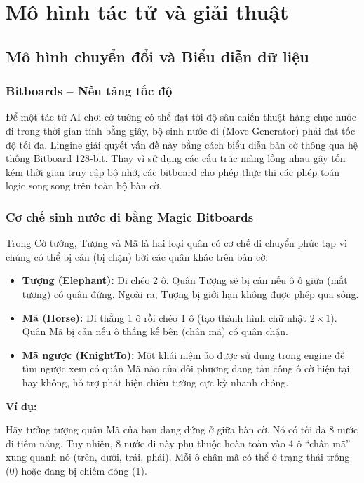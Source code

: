 \chapter{Mô hình tác tử và giải thuật}

\section{Mô hình chuyển đổi và Biểu diễn dữ liệu}

\subsection{Bitboards -- Nền tảng tốc độ}

Để một tác tử AI chơi cờ tướng có thể đạt tới độ sâu chiến thuật hàng chục nước đi trong thời gian tính bằng giây, bộ sinh nước đi (Move Generator) phải đạt tốc độ tối đa. Lingine giải quyết vấn đề này bằng cách biểu diễn bàn cờ thông qua hệ thống Bitboard 128-bit. Thay vì sử dụng các cấu trúc mảng lồng nhau gây tốn kém thời gian truy cập bộ nhớ, các bitboard cho phép thực thi các phép toán logic song song trên toàn bộ bàn cờ.

\subsection{Cơ chế sinh nước đi bằng Magic Bitboards}

Trong Cờ tướng, Tượng và Mã là hai loại quân có cơ chế di chuyển phức tạp vì chúng có thể bị cản (bị chặn) bởi các quân khác trên bàn cờ:
\begin{itemize}
    \item \textbf{Tượng (Elephant):} Đi chéo 2 ô. Quân Tượng sẽ bị cản nếu ô ở giữa (mắt tượng) có quân đứng. Ngoài ra, Tượng bị giới hạn không được phép qua sông.
    \item \textbf{Mã (Horse):} Đi thẳng 1 ô rồi chéo 1 ô (tạo thành hình chữ nhật $2 \times 1$). Quân Mã bị cản nếu ô thẳng kế bên (chân mã) có quân chặn.
    \item \textbf{Mã ngược (KnightTo):} Một khái niệm ảo được sử dụng trong engine để tìm ngược xem có quân Mã nào của đối phương đang tấn công ô cờ hiện tại hay không, hỗ trợ phát hiện chiếu tướng cực kỳ nhanh chóng.
\end{itemize}

\noindent\textbf{Ví dụ:}

Hãy tưởng tượng quân Mã của bạn đang đứng ở giữa bàn cờ. Nó có tối đa 8 nước đi tiềm năng. Tuy nhiên, 8 nước đi này phụ thuộc hoàn toàn vào 4 ô ``chân mã'' xung quanh nó (trên, dưới, trái, phải). Mỗi ô chân mã có thể ở trạng thái trống (0) hoặc đang bị chiếm đóng (1).

